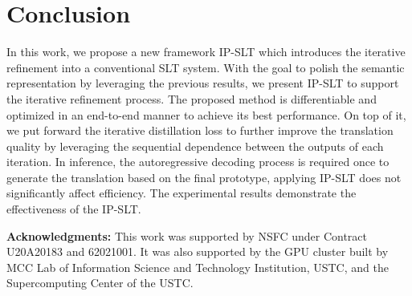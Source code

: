 \documentclass[10pt,twocolumn,letterpaper]{article}
\begin{document}
    \begin{table}[!t]
    \centering
    \scriptsize
    \setlength{\tabcolsep}{3.5pt}
     \vspace{0.5mm}
     \caption{
     Qualitative evaluation.
     `GT' denotes the spoken language translation annotation. `Baseline' and `Our' denote the translation result of baseline and our IP-SLT, respectively.}
     \label{tab:A8}
     \vspace{-1mm}
     \end{table}
     
    
\section{Conclusion}
In this work, we propose a new framework IP-SLT which introduces the iterative refinement into a conventional SLT system. With the goal to polish the semantic representation by leveraging the previous results, we present IP-SLT to support the iterative refinement process. The proposed method is differentiable and optimized in an end-to-end manner to achieve its best performance.
On top of it, we put forward the iterative distillation loss to further improve the translation quality by leveraging the sequential dependence between the outputs of each iteration.
In inference, the autoregressive decoding process is required once to generate the translation based on the final prototype, applying IP-SLT does not significantly affect efficiency.
The experimental results demonstrate the effectiveness of the IP-SLT.

\smallskip \noindent \textbf{Acknowledgments:} This work was supported by NSFC under Contract U20A20183 and 62021001. It was also supported by the GPU cluster built by MCC Lab of Information Science and Technology Institution, USTC, and the Supercomputing Center of the USTC.



{\small


}
\end{document}
